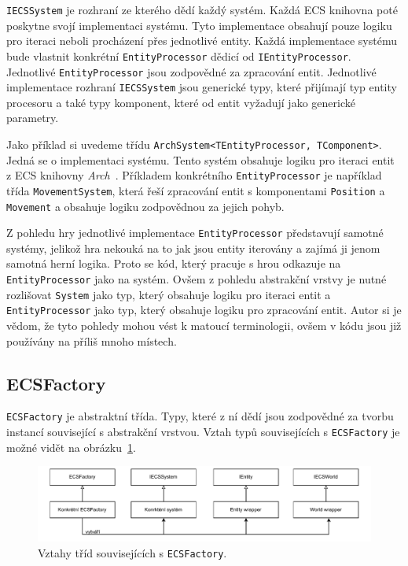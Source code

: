 \texttt{IECSSystem} je rozhraní ze kterého dědí každý systém. Každá ECS knihovna poté poskytne svojí implementaci systému. Tyto implementace obsahují pouze logiku pro iteraci neboli procházení přes jednotlivé entity. Každá implementace systému bude vlastnit konkrétní \texttt{EntityProcessor} dědicí od \texttt{IEntityProcessor}. Jednotlivé \texttt{EntityProcessor} jsou zodpovědné za zpracování entit. Jednotlivé implementace rozhraní \texttt{IECSSystem} jsou generické typy, které přijímají typ entity procesoru a také typy komponent, které od entit vyžadují jako generické parametry.

Jako příklad si uvedeme třídu \texttt{ArchSystem<TEntityProcessor, TComponent>}. Jedná se o implementaci systému. Tento systém obsahuje logiku pro iteraci entit z ECS knihovny \textit{Arch}~\cite{Arch}. Příkladem konkrétního \texttt{EntityProcessor} je například třída \texttt{MovementSystem}, která řeší zpracování entit s komponentami \texttt{Position} a \texttt{Movement} a obsahuje logiku zodpovědnou za jejich pohyb.

Z pohledu hry jednotlivé implementace \texttt{EntityProcessor} představují samotné systémy, jelikož hra nekouká na to jak jsou entity iterovány a zajímá ji jenom samotná herní logika. Proto se kód, který pracuje s hrou odkazuje na \texttt{EntityProcessor} jako na systém. Ovšem z pohledu abstrakční vrstvy je nutné rozlišovat \texttt{System} jako typ, který obsahuje logiku pro iteraci entit a \texttt{EntityProcessor} jako typ, který obsahuje logiku pro zpracování entit. Autor si je vědom, že tyto pohledy mohou vést k matoucí terminologii, ovšem v kódu jsou již používány na příliš mnoho místech.

\subsection{ECSFactory}
\texttt{ECSFactory} je abstraktní třída. Typy, které z ní dědí jsou zodpovědné za tvorbu instancí související s abstrakční vrstvou. Vztah typů souvisejících s \texttt{ECSFactory} je možné vidět na obrázku~\ref{fig:abstract-layer-ecsfactory}.

\begin{figure}[!htb]
  \centering
  \includegraphics[width=1.0\linewidth]{img/abstract-layer-ecsfactory.pdf}
  \caption{Vztahy tříd souvisejících s \texttt{ECSFactory}.}
  \label{fig:abstract-layer-ecsfactory}
\end{figure}

